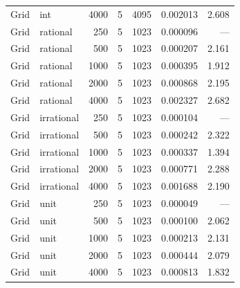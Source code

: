 \begin{longtable}{l l r r r r r}
Grid & int & 4000 & 5 & 4095 & 0.002013 & 2.608 \\
\addlinespace
Grid & rational & 250 & 5 & 1023 & 0.000096 & --- \\
Grid & rational & 500 & 5 & 1023 & 0.000207 & 2.161 \\
Grid & rational & 1000 & 5 & 1023 & 0.000395 & 1.912 \\
Grid & rational & 2000 & 5 & 1023 & 0.000868 & 2.195 \\
Grid & rational & 4000 & 5 & 1023 & 0.002327 & 2.682 \\
\addlinespace
Grid & irrational & 250 & 5 & 1023 & 0.000104 & --- \\
Grid & irrational & 500 & 5 & 1023 & 0.000242 & 2.322 \\
Grid & irrational & 1000 & 5 & 1023 & 0.000337 & 1.394 \\
Grid & irrational & 2000 & 5 & 1023 & 0.000771 & 2.288 \\
Grid & irrational & 4000 & 5 & 1023 & 0.001688 & 2.190 \\
\addlinespace
Grid & unit & 250 & 5 & 1023 & 0.000049 & --- \\
Grid & unit & 500 & 5 & 1023 & 0.000100 & 2.062 \\
Grid & unit & 1000 & 5 & 1023 & 0.000213 & 2.131 \\
Grid & unit & 2000 & 5 & 1023 & 0.000444 & 2.079 \\
Grid & unit & 4000 & 5 & 1023 & 0.000813 & 1.832 \\
\end{longtable}

\bigskip

